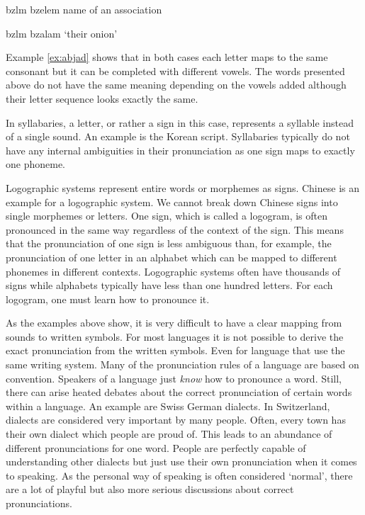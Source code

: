 \begin{description}
\begin{covsubexamples}[preamble={The example shows Hebrew words that are first mapped to the Latin alphabet, then to the Latin alphabet including vowels and in the end to the English translation.}]
\label{ex:abjad}
\item {} \>\> bzlm \>\> bzelem \>\> name of an association
\item {} \>\> bzlm \>\> bzalam \>\> `their onion'
\end{covsubexamples}

Example \ref{ex:abjad} shows that in both cases each letter maps to the same consonant but it can be completed with different vowels. The words presented above do not have the same meaning depending on the vowels added although their letter sequence looks exactly the same. 

\item[\textsc{Syllabary}] In syllabaries, a letter, or rather a sign in this case, represents a syllable instead of a single sound. An example is the Korean script. Syllabaries typically do not have any internal ambiguities in their pronunciation as one sign maps to exactly one phoneme.   

\item[\textsc{Logographic systems}] Logographic systems represent entire words or morphemes as signs. Chinese is an example for a logographic system. We cannot break down Chinese signs into single morphemes or letters. One sign, which is called a logogram, is often pronounced in the same way regardless of the context of the sign. This means that the pronunciation of one sign is less ambiguous than, for example, the pronunciation of one letter in an alphabet which can be mapped to different phonemes in different contexts. Logographic systems often have thousands of signs while alphabets typically have less than one hundred letters. For each logogram, one must learn how to pronounce it.
\end{description}

As the examples above show, it is very difficult to have a clear mapping from sounds to written symbols. For most languages it is not possible to derive the exact pronunciation from the written symbols. Even for language that use the same writing system. Many of the pronunciation rules of a language are based on convention. Speakers of a language just \textit{know} how to pronounce a word. Still, there can arise heated debates about the correct pronunciation of certain words within a language. An example are Swiss German dialects. In Switzerland, dialects are considered very important by many people. Often, every town has their own dialect which people are proud of. This leads to an abundance of different pronunciations for one word. People are perfectly capable of understanding other dialects but just use their own pronunciation when it comes to speaking. As the personal way of speaking is often considered `normal', there are a lot of playful but also more serious discussions about correct pronunciations. 

